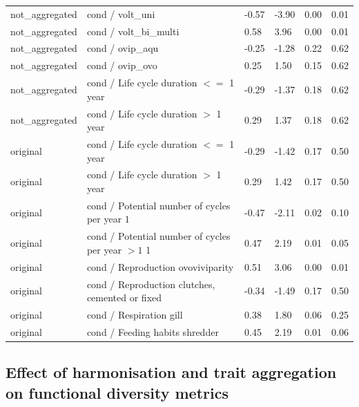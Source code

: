 \documentclass[12pt]{article}
\begin{document}
\begin{longtable}[H]{m{2.6cm}|m{7.3cm}|m{1cm}|m{1.4cm}|m{1.5cm}|m{1.5cm}}
      not\_aggregated & cond / volt\_uni & -0.57 & -3.90 & 0.00 & 0.01 \\ 
      not\_aggregated & cond / volt\_bi\_multi & 0.58 & 3.96 & 0.00 & 0.01 \\ 
      not\_aggregated & cond / ovip\_aqu & -0.25 & -1.28 & 0.22 & 0.62 \\ 
      not\_aggregated & cond / ovip\_ovo & 0.25 & 1.50 & 0.15 & 0.62 \\ 
      not\_aggregated & cond / Life cycle duration $<=$ 1 year & -0.29 & -1.37 & 0.18 & 0.62 \\ 
      not\_aggregated & cond / Life cycle duration $>$ 1 year & 0.29 & 1.37 & 0.18 & 0.62 \\ 
      original & cond / Life cycle duration $<=$ 1 year & -0.29 & -1.42 & 0.17 & 0.50 \\ 
      original & cond / Life cycle duration $>$ 1 year & 0.29 & 1.42 & 0.17 & 0.50 \\ 
      original & cond / Potential number of cycles per year $1$ & -0.47 & -2.11 & 0.02 & 0.10 \\ 
      original & cond / Potential number of cycles per year $> 1$ 1 & 0.47 & 2.19 & 0.01 & 0.05 \\ 
      original & cond / Reproduction ovoviviparity & 0.51 & 3.06 & 0.00 & 0.01 \\ 
      original & cond / Reproduction clutches, cemented or fixed & -0.34 & -1.49 & 0.17 & 0.50 \\ 
      original & cond / Respiration gill & 0.38 & 1.80 & 0.06 & 0.25 \\ 
      original & cond / Feeding habits shredder & 0.45 & 2.19 & 0.01 & 0.06 \\ 
     \bottomrule
\end{longtable}


\newpage 

\subsection*{Effect of harmonisation and trait aggregation on functional diversity metrics}
\end{document}
